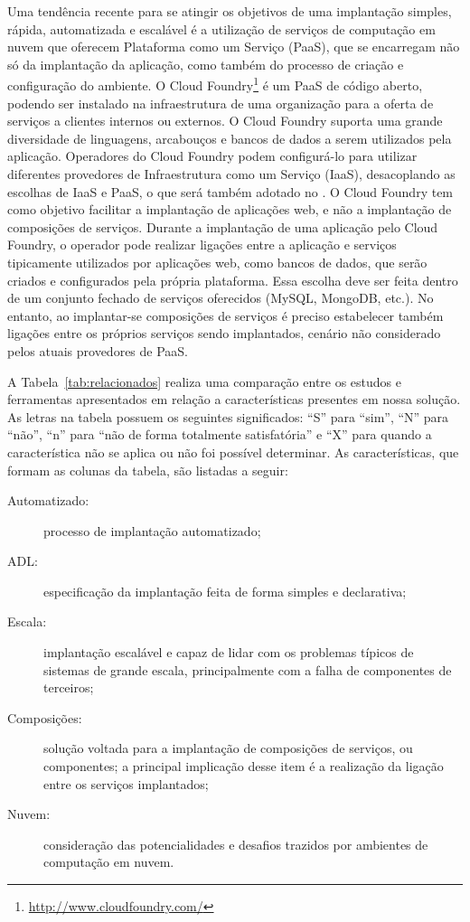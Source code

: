 Uma tendência recente para se atingir os objetivos de uma implantação simples, rápida, automatizada e escalável é a utilização de serviços de computação em nuvem que oferecem Plataforma como um Serviço (PaaS), que se encarregam não só da implantação da aplicação, como também do processo de criação e configuração do ambiente. O Cloud Foundry\footnote{\url{http://www.cloudfoundry.com/}} é um PaaS de código aberto, podendo ser instalado na infraestrutura de uma organização para a oferta de serviços a clientes internos ou externos. O Cloud Foundry suporta uma grande diversidade de linguagens, arcabouços e bancos de dados a serem utilizados pela aplicação. Operadores do Cloud Foundry podem configurá-lo para utilizar diferentes provedores de Infraestrutura como um Serviço (IaaS), desacoplando as escolhas de IaaS e PaaS, o que será também adotado no \ee. O Cloud Foundry tem como objetivo facilitar a implantação de aplicações web, e não a implantação de composições de serviços. Durante a implantação de uma aplicação pelo Cloud Foundry, o operador pode realizar ligações entre a aplicação e serviços tipicamente utilizados por aplicações web, como bancos de dados, que serão criados e configurados pela própria plataforma. Essa escolha deve ser feita dentro de um conjunto fechado de serviços oferecidos (MySQL, MongoDB, etc.). No entanto, ao implantar-se composições de serviços é preciso estabelecer também ligações entre os próprios serviços sendo implantados, cenário não considerado pelos atuais provedores de PaaS.

A Tabela~\ref{tab:relacionados} realiza uma comparação entre os estudos e ferramentas apresentados em relação a características presentes em nossa solução. As letras na tabela possuem os seguintes significados: ``S'' para ``sim'', ``N'' para ``não'', ``n'' para ``não de forma totalmente satisfatória'' e ``X'' para quando a característica não se aplica ou não foi possível determinar. As características, que formam as colunas da tabela, são listadas a seguir:

\begin{description}
\item [Automatizado:] processo de implantação automatizado;
\item [ADL:] especificação da implantação feita de forma simples e declarativa;
\item [Escala:] implantação escalável e capaz de lidar com os problemas típicos de sistemas de grande escala, principalmente com a falha de componentes de terceiros;
\item [Composições:] solução voltada para a implantação de composições de serviços, ou componentes; a principal implicação desse item é a realização da ligação entre os serviços implantados;
\item [Nuvem:] consideração das potencialidades e desafios trazidos por ambientes de computação em nuvem.
\end{description}

